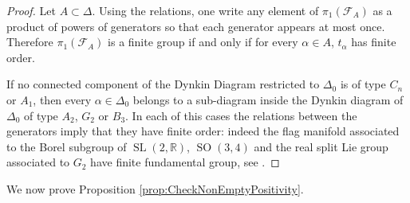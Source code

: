 \documentclass[reqno,10pt]{amsart}
\theoremstyle{plain}
\theoremstyle{definition}
\theoremstyle{remark}
\newcommand{\R}{\mathbb{R}}
\DeclareMathOperator{\SL}{SL}
\DeclareMathOperator{\SO}{SO}
\begin{document}
\begin{proof}
Let $A\subset \Delta$. Using the relations, one write any element of $\pi_1(\mathcal{F}_A)$ as a product of powers of generators so that each generator appears at most once. Therefore $\pi_1(\mathcal{F}_A)$ is a finite group if and only if for every $\alpha \in A$, $t_\alpha$ has finite order.

\medskip

If no connected component of the Dynkin Diagram restricted to $\Delta_0$ is of type $C_n$ or $A_1$, then every $\alpha\in \Delta_0$ belongs to a sub-diagram inside the Dynkin diagram of $\Delta_0$ of type $A_2$, $G_2$ or $B_3$. In each of this cases the relations between the generators imply that they have finite order: indeed the flag manifold associated to the Borel subgroup of $\SL(2, \R)$, $\SO(3,4)$ and the real split Lie group associated to $G_2$ have finite fundamental group, see \cite{ThesisTopologyFlag}.
\end{proof}


We now prove Proposition \ref{prop:CheckNonEmptyPositivity}. 

\medskip
\end{document}
